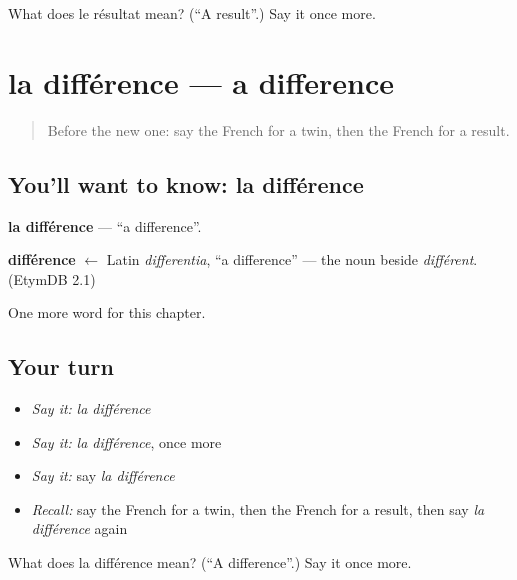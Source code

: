 \begin{tcolorbox}[breakable,colback=teal!4,colframe=teal!35!black,title={Before you move on}]
What does le résultat mean? (\textquotedblleft{}A result\textquotedblright{}.) Say it once more.
\end{tcolorbox}
\section[la différence]{la différence — a difference}

\label{lesson:FR-C251-difference}



\begin{quote}
Before the new one: say the French for a twin, then the French for a result.
\end{quote}

\subsection*{You'll want to know: la différence}
\textbf{la différence} — \textquotedblleft{}a difference\textquotedblright{}.

\begin{cousinweb}
\textbf{différence} $\leftarrow$ Latin \emph{differentia}, \textquotedblleft{}a difference\textquotedblright{} — the noun beside \emph{différent}. (EtymDB 2.1)
\end{cousinweb}

\begin{grammarlens}[title={What you've built}]
One more word for this chapter.
\end{grammarlens}

\subsection*{Your turn}
\begin{itemize}
\raggedright
  \item \emph{Say it:} \emph{la différence}
  \item \emph{Say it:} \emph{la différence}, once more
  \item \emph{Say it:} say \emph{la différence}
  \item \emph{Recall:} say the French for a twin, then the French for a result, then say \emph{la différence} again
\end{itemize}

\begin{tcolorbox}[breakable,colback=teal!4,colframe=teal!35!black,title={Before you move on}]
What does la différence mean? (\textquotedblleft{}A difference\textquotedblright{}.) Say it once more.
\end{tcolorbox}
